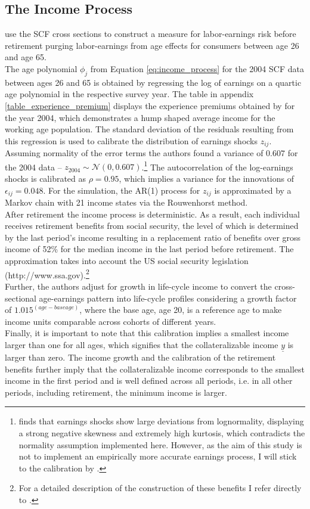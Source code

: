 \documentclass[a4paper,12pt,legno]{article}
\begin{document}
\subsection{The Income Process}
\cite{hintermaier2011} use the SCF cross sections to construct a measure for labor-earnings risk before retirement purging labor-earnings from age effects for consumers between age 26 and age 65.\\ 
The age polynomial $\phi_{j}$ from Equation \ref{eq:income_process} for the 2004 SCF data between ages 26 and 65 is obtained by regressing the log of earnings on a quartic age polynomial in the respective survey year. The table in appendix \ref{table_experience_premium} displays the experience premiums obtained by \cite{hintermaier2011} for the year 2004, which demonstrates a hump shaped average income for the working age population.
The standard deviation of the residuals resulting from this regression is used to calibrate the distribution of earnings shocks $z_{ij}$. Assuming normality of the error terms the authors found a variance of $0.607$ for the 2004 data \---  $z_{2004} \sim \mathcal{N}(0,0.607)$.\footnote{\cite{guvenen2015data} finds that earnings shocks show large deviations from lognormality, displaying a strong negative skewness and extremely high kurtosis, which contradicts the normality assumption implemented here. However, as the aim of this study is not to implement an empirically more accurate earnings process, I will stick to the calibration by \cite{hintermaier2011}.} The autocorrelation of the log-earnings shocks is calibrated as $\rho = 0.95$, which implies a variance for the innovations of $\epsilon_{ij} = 0.048$. For the simulation, the AR(1) process for $z_{ij}$ is approximated by a Markov chain with 21 income states via the Rouwenhorst method. \\
After retirement the income process is deterministic. As a result, each individual receives retirement benefits from social security, the level of which is determined by the last period's income resulting in a replacement ratio of benefits over gross income of 52\% for the median income in the last period before retirement. The approximation takes into account the US social security legislation (http://www.ssa.gov).\footnote{For a detailed description of the construction of these benefits I refer directly to \cite{hintermaier2011}.} \\
Further, the authors adjust for growth in life-cycle income to convert the cross-sectional age-earnings pattern into life-cycle profiles considering a growth factor of $1.015^{(age-base age)}$, where the base age, age 20, is a reference age to make income units comparable across cohorts of different years.\\
Finally, it is important to note that this calibration implies a smallest income larger than one for all ages, which signifies that the collateralizable income $\underline{y}$ is larger than zero. The income growth and the calibration of the retirement benefits further imply that the collateralizable income corresponds to the smallest income in the first period and is well defined across all periods, i.e. in all other periods, including retirement, the minimum income is larger. 
\end{document}
